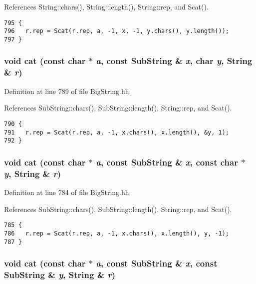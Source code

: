 References String::chars(), String::length(), String::rep, and Scat().



\footnotesize\begin{verbatim}795 {
796   r.rep = Scat(r.rep, a, -1, x, -1, y.chars(), y.length());
797 }
\end{verbatim}\normalsize 
{}
\subsubsection{\setlength{\rightskip}{0pt plus 5cm}void cat (const char $\ast$ {\em a}, const {\bf Sub\-String} \& {\em x}, char {\em y}, {\bf String} \& {\em r})\hspace{0.3cm}{\tt  [inline]}}\label{BigString_8hh_a65}




Definition at line 789 of file Big\-String.hh.

References Sub\-String::chars(), Sub\-String::length(), String::rep, and Scat().



\footnotesize\begin{verbatim}790 {
791   r.rep = Scat(r.rep, a, -1, x.chars(), x.length(), &y, 1);
792 }
\end{verbatim}\normalsize 
{}
\subsubsection{\setlength{\rightskip}{0pt plus 5cm}void cat (const char $\ast$ {\em a}, const {\bf Sub\-String} \& {\em x}, const char $\ast$ {\em y}, {\bf String} \& {\em r})\hspace{0.3cm}{\tt  [inline]}}\label{BigString_8hh_a64}




Definition at line 784 of file Big\-String.hh.

References Sub\-String::chars(), Sub\-String::length(), String::rep, and Scat().



\footnotesize\begin{verbatim}785 {
786   r.rep = Scat(r.rep, a, -1, x.chars(), x.length(), y, -1);
787 }
\end{verbatim}\normalsize 
{}
\subsubsection{\setlength{\rightskip}{0pt plus 5cm}void cat (const char $\ast$ {\em a}, const {\bf Sub\-String} \& {\em x}, const {\bf Sub\-String} \& {\em y}, {\bf String} \& {\em r})\hspace{0.3cm}{\tt  [inline]}}\label{BigString_8hh_a63}




